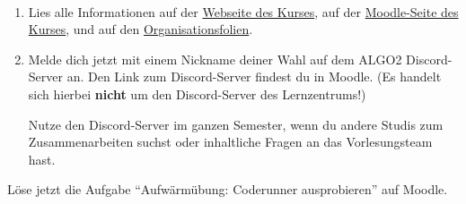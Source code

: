 \documentclass{uebung_cs}
\begin{document}
\begin{aufgabe}[Orga]\
  \begin{enumerate}
    \item Lies alle Informationen auf der \href{https://tcs.uni-frankfurt.de/algo2/}{Webseite des Kurses}, auf der \href{https://moodle.studiumdigitale.uni-frankfurt.de/moodle/course/view.php?id=2241}{Moodle-Seite des Kurses}, und auf den \href{https://tcs.uni-frankfurt.de/algo2/ALGO2-Organisation.pdf}{Organisationsfolien}.
    \item Melde dich jetzt mit einem Nickname deiner Wahl auf dem ALGO2 Discord-Server an. Den Link zum Discord-Server findest du in Moodle. (Es handelt sich hierbei \textbf{nicht} um den Discord-Server des Lernzentrums!)

    Nutze den Discord-Server im ganzen Semester, wenn du andere Studis zum Zusammenarbeiten suchst oder inhaltliche Fragen an das Vorlesungsteam hast.
  \end{enumerate}
\end{aufgabe}

\begin{aufgabe}
    Löse jetzt die Aufgabe \enquote{Aufwärmübung: Coderunner ausprobieren} auf Moodle.
\end{aufgabe}

\end{document}
